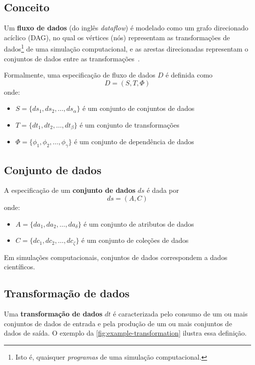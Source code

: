 
\subsection{Conceito}

Um \textbf{fluxo de dados} (do inglês \textit{dataflow}) é modelado como um grafo direcionado acíclico (DAG), no qual os vértices (nós) representam as transformações de dados\footnote{Isto é, quaisquer \emph{programas} de uma simulação computacional.} de uma simulação computacional, e as arestas direcionadas representam o conjuntos de dados entre as transformações~\cite{silva2017raw}.

Formalmente, uma especificação de fluxo de dados \( D \) é definida como \[ D = (S, T, \Phi) \] onde:
\begin{itemize}
    \item \( S = \{ds_1, ds_2, \ldots, ds_{\alpha}\} \) é um conjunto de conjuntos de dados
    \item \( T = \{dt_1, dt_2, \ldots, dt_{\beta}\} \) é um conjunto de transformações
    \item \( \Phi = \{\phi_1, \phi_2, \ldots, \phi_{\gamma}\} \) é um conjunto de dependência de dados
\end{itemize}

\subsection{Conjunto de dados}

A especificação de um \textbf{conjunto de dados} \( ds \) é dada por \[ ds = (A, C) \] onde:
\begin{itemize}
    \item \( A = \{da_1, da_2, \ldots, da_{\delta} \} \) é um conjunto de atributos de dados
    \item \( C = \{dc_1, dc_2, \ldots, dc_{\zeta} \} \) é um conjunto de coleções de dados
\end{itemize}

Em simulações computacionais, conjuntos de dados correspondem a dados científicos.

\subsection{Transformação de dados}

Uma \textbf{transformação de dados} \( dt \) é caracterizada pelo consumo de um ou mais conjuntos de dados de entrada e pela produção de um ou mais conjuntos de dados de saída. O exemplo da \autoref{fig:example-transformation} ilustra essa definição.

